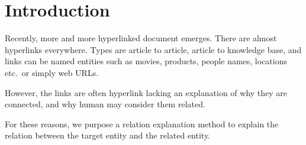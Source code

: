 \section{Introduction}

Recently, more and more hyperlinked document emerges. There are almost hyperlinks everywhere. Types are article to article, article to knowledge base, and links can be named entities such as movies, products, people names, locations etc.\ or simply web URLs.

However, the links are often hyperlink lacking an explanation of why they are connected, and why human may consider them related.

For these reasons, we purpose a relation explanation method to explain the relation between the target entity and the related entity.